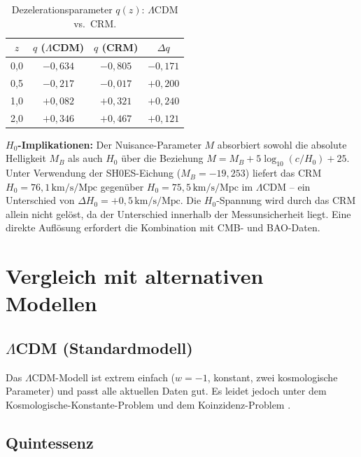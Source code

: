\documentclass[aps,prd,twocolumn,superscriptaddress,nofootinbib]{revtex4-2}
\begin{document}
\begin{table}[H]
\centering
\caption{Dezelerationsparameter $q(z)$: $\Lambda$CDM vs.\ CRM.}
\label{tab:qz}
\begin{tabular}{cccc}
\toprule
$z$ & $q$ ($\Lambda$CDM) & $q$ (CRM) & $\Delta q$ \\
\midrule
0,0 & $-0{,}634$ & $-0{,}805$ & $-0{,}171$ \\
0,5 & $-0{,}217$ & $-0{,}017$ & $+0{,}200$ \\
1,0 & $+0{,}082$ & $+0{,}321$ & $+0{,}240$ \\
2,0 & $+0{,}346$ & $+0{,}467$ & $+0{,}121$ \\
\bottomrule
\end{tabular}
\end{table}

\textbf{$H_0$-Implikationen:} Der Nuisance-Parameter $M$ absorbiert sowohl die absolute Helligkeit $M_B$ als auch $H_0$ \"uber die Beziehung $M = M_B + 5\log_{10}(c/H_0) + 25$. Unter Verwendung der SH0ES-Eichung ($M_B = -19{,}253$) liefert das CRM $H_0 = 76{,}1\,\mathrm{km/s/Mpc}$ gegen\"uber $H_0 = 75{,}5\,\mathrm{km/s/Mpc}$ im $\Lambda$CDM -- ein Unterschied von $\Delta H_0 = +0{,}5\,\mathrm{km/s/Mpc}$. Die $H_0$-Spannung wird durch das CRM allein nicht gel\"ost, da der Unterschied innerhalb der Messunsicherheit liegt. Eine direkte Aufl\"osung erfordert die Kombination mit CMB- und BAO-Daten.

\section{Vergleich mit alternativen Modellen}
\label{sec:alternativen}

\subsection{$\Lambda$CDM (Standardmodell)}

Das $\Lambda$CDM-Modell ist extrem einfach ($w = -1$, konstant, zwei kosmologische Parameter) und passt alle aktuellen Daten gut. Es leidet jedoch unter dem Kosmologische-Konstante-Problem und dem Koinzidenz-Problem \cite{Weinberg1989}.

\subsection{Quintessenz}
\end{document}
